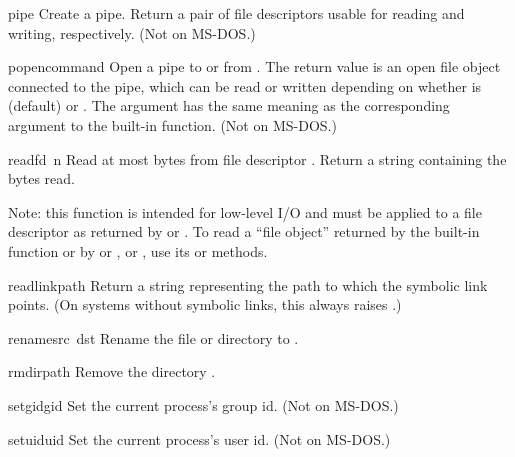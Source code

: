 \begin{funcdesc}{pipe}{}
Create a pipe.  Return a pair of file descriptors 
usable for reading and writing, respectively.
(Not on MS-DOS.)
\end{funcdesc}

\begin{funcdesc}{popen}{command}
Open a pipe to or from .  The return value is an open
file object connected to the pipe, which can be read or written
depending on whether  is  (default) or .
The  argument has the same meaning as the corresponding
argument to the built-in  function.
(Not on MS-DOS.)
\end{funcdesc}

\begin{funcdesc}{read}{fd\, n}
Read at most  bytes from file descriptor .
Return a string containing the bytes read.

Note: this function is intended for low-level I/O and must be applied
to a file descriptor as returned by  or
.  To read a ``file object'' returned by the
built-in function  or by  or
, or , use its
 or  methods.
\end{funcdesc}

\begin{funcdesc}{readlink}{path}
Return a string representing the path to which the symbolic link
points.  (On systems without symbolic links, this always raises
.)
\end{funcdesc}

\begin{funcdesc}{rename}{src\, dst}
Rename the file or directory  to .
\end{funcdesc}

\begin{funcdesc}{rmdir}{path}
Remove the directory .
\end{funcdesc}

\begin{funcdesc}{setgid}{gid}
Set the current process's group id.
(Not on MS-DOS.)
\end{funcdesc}

\begin{funcdesc}{setuid}{uid}
Set the current process's user id.
(Not on MS-DOS.)
\end{funcdesc}


